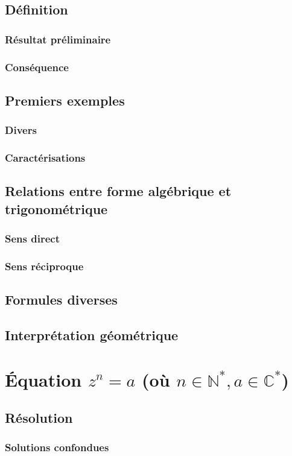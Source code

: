 \documentclass[12pt,a4paper,french]{book}
\begin{document}
		\subsection{Définition}
			\subsubsection{Résultat préliminaire}
			\subsubsection{Conséquence}
		\subsection{Premiers exemples}
			\subsubsection{Divers}
			\subsubsection{Caractérisations}
		\subsection{Relations entre forme algébrique et trigonométrique}
			\subsubsection{Sens direct}
			\subsubsection{Sens réciproque}
		\subsection{Formules diverses}
		\subsection{Interprétation géométrique}
	\section{Équation $z^{n}=a$ (où $n\in \mathbb{N}^{\ast},a\in \mathbb{C}^{\ast}$)}
		\subsection{Résolution}
			\subsubsection{Solutions confondues}
\end{document}

